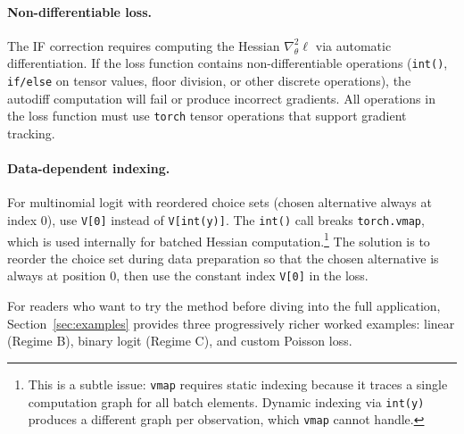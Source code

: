 \paragraph{Non-differentiable loss.} The IF correction requires computing the Hessian $\nabla_\theta^2 \ell$ via automatic differentiation. If the loss function contains non-differentiable operations (\texttt{int()}, \texttt{if/else} on tensor values, floor division, or other discrete operations), the autodiff computation will fail or produce incorrect gradients. All operations in the loss function must use \texttt{torch} tensor operations that support gradient tracking.

\paragraph{Data-dependent indexing.} For multinomial logit with reordered choice sets (chosen alternative always at index 0), use \texttt{V[0]} instead of \texttt{V[int(y)]}. The \texttt{int()} call breaks \texttt{torch.vmap}, which is used internally for batched Hessian computation.\footnote{This is a subtle issue: \texttt{vmap} requires static indexing because it traces a single computation graph for all batch elements. Dynamic indexing via \texttt{int(y)} produces a different graph per observation, which \texttt{vmap} cannot handle.} The solution is to reorder the choice set during data preparation so that the chosen alternative is always at position 0, then use the constant index \texttt{V[0]} in the loss.

For readers who want to try the method before diving into the full application, Section~\ref{sec:examples} provides three progressively richer worked examples: linear (Regime B), binary logit (Regime C), and custom Poisson loss.

